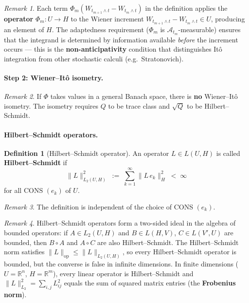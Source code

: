 \documentclass[11pt]{article}
\theoremstyle{definition}
\newtheorem{definition}{Definition}
\theoremstyle{remark}
\newtheorem{remark}{Remark}
\begin{document}
\begin{remark}
Each term $\Phi_m(W_{t_{m+1} \wedge t} - W_{t_m \wedge t})$ in the definition applies the \textbf{operator} $\Phi_m \colon U \to H$ to the Wiener increment $W_{t_{m+1} \wedge t} - W_{t_m \wedge t} \in U$, producing an element of $H$.  The adaptedness requirement ($\Phi_m$ is $\mathcal{A}_{t_m}$-measurable) ensures that the integrand is determined by information available \emph{before} the increment occurs --- this is the \textbf{non-anticipativity} condition that distinguishes It\^o integration from other stochastic calculi (e.g.\ Stratonovich).
\end{remark}

\paragraph{Step 2: Wiener--Itô isometry.}


\begin{remark}
If $\Phi$ takes values in a general Banach space,
there is \textbf{no} Wiener--Itô isometry.
The isometry requires $Q$ to be trace class and $\sqrt{Q}$
to be Hilbert--Schmidt.
\end{remark}

\paragraph{Hilbert--Schmidt operators.}

\begin{definition}[Hilbert--Schmidt operator]
An operator $L \in L(U, H)$ is called \textbf{Hilbert--Schmidt} if
\[
    \|L\|_{L_2(U,H)}^2
    \;:=\;
    \sum_{k=1}^{\infty} \|L\,e_k\|_H^2
    \;<\; \infty
\]
for all CONS $(e_k)$ of $U$.
\end{definition}

\begin{remark}
The definition is independent of the choice of CONS $(e_k)$.
\end{remark}

\begin{remark}
Hilbert--Schmidt operators form a two-sided ideal in the algebra of bounded operators: if $A \in L_2(U, H)$ and $B \in L(H, V)$, $C \in L(V', U)$ are bounded, then $B \circ A$ and $A \circ C$ are also Hilbert--Schmidt.  The Hilbert--Schmidt norm satisfies $\|L\|_{\mathrm{op}} \le \|L\|_{L_2(U,H)}$, so every Hilbert--Schmidt operator is bounded, but the converse is false in infinite dimensions.  In finite dimensions ($U = \mathbb{R}^n$, $H = \mathbb{R}^m$), every linear operator is Hilbert--Schmidt and $\|L\|_{L_2}^2 = \sum_{i,j} L_{ij}^2$ equals the sum of squared matrix entries (the \textbf{Frobenius norm}).
\end{remark}
\end{document}
